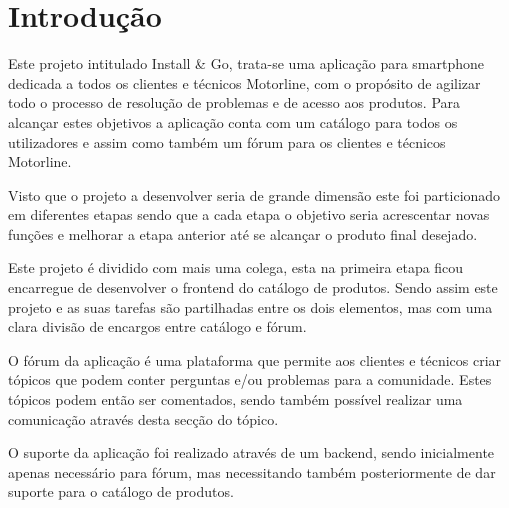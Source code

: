 
\chapter{Introdução}
Este projeto intitulado Install \& Go, trata-se uma aplicação para smartphone dedicada a todos os clientes e 
técnicos Motorline, com o propósito de agilizar todo o processo de resolução de problemas e de acesso 
aos produtos. Para alcançar estes objetivos a aplicação conta com um catálogo para todos os utilizadores 
e assim como também um fórum para os clientes e técnicos Motorline.

Visto que o projeto a desenvolver seria de grande dimensão este foi particionado em diferentes etapas 
sendo que a cada etapa o objetivo seria acrescentar novas funções e melhorar a etapa anterior até se 
alcançar o produto final desejado.

Este projeto é dividido com mais uma colega, esta na primeira etapa ficou encarregue de desenvolver 
o frontend do catálogo de produtos. Sendo assim este projeto e as suas tarefas são partilhadas entre os dois elementos, 
mas com uma clara divisão de encargos entre catálogo e fórum.


O fórum da aplicação é uma plataforma que permite aos clientes e técnicos criar tópicos que podem conter 
perguntas e/ou problemas para a comunidade. Estes tópicos podem então 
ser comentados, sendo também possível realizar uma comunicação através desta secção do tópico.

O suporte da aplicação foi realizado através de um backend, sendo inicialmente apenas 
necessário para fórum, mas necessitando também posteriormente de dar suporte para o catálogo de produtos.





